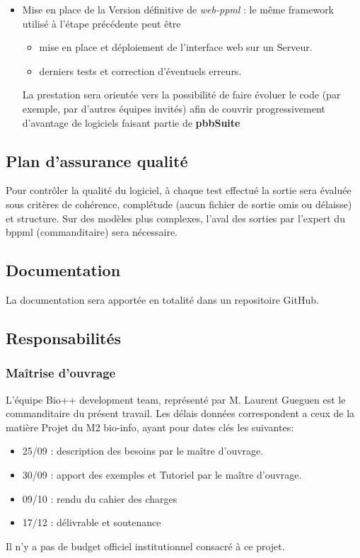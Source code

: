 \begin{itemize}
	\item Mise en place de la Version définitive de \textit{web-ppml} : le même framework utilisé à l'étape précédente peut être 
		
	\begin{itemize}
		\item mise en place et déploiement de l'interface web sur un Serveur.
		\item derniers tests et correction d'éventuels erreurs.
	\end{itemize}
	
	La prestation sera orientée vers la possibilité de faire évoluer le code (par exemple, par d'autres équipes invités) 
	afin de couvrir progressivement d'avantage de logiciels faisant partie de \textbf{pbbSuite}
\end{itemize}


\subsection{Plan d'assurance qualité}
 Pour contrôler la qualité du logiciel, à chaque test effectué la sortie sera  
 évaluée sous critères de cohérence, complétude (aucun fichier de sortie omis ou délaisse)
 et structure. Sur des modèles plus complexes, l'aval des sorties par l'expert du bppml (commanditaire) sera nécessaire.
 
\subsection{Documentation} 
La documentation sera apportée en totalité dans un repositoire GitHub.

	
\subsection{Responsabilités}
\subsubsection{Maîtrise d'ouvrage}
L'équipe Bio++ development team, représenté par M. Laurent Gueguen est le
 commanditaire du présent travail. Les délais données correspondent a ceux de la matière 
 Projet du M2 bio-info, ayant pour dates clés les suivantes:
\begin{itemize}
	\item 25/09 : description des besoins par le maître d'ouvrage.
	\item 30/09 : apport des exemples et Tutoriel par le maître d'ouvrage.
	\item 09/10 : rendu du cahier des charges 
	\item 17/12 : délivrable et soutenance 
\end{itemize}
Il n'y a pas de budget officiel institutionnel consacré à ce projet. 

